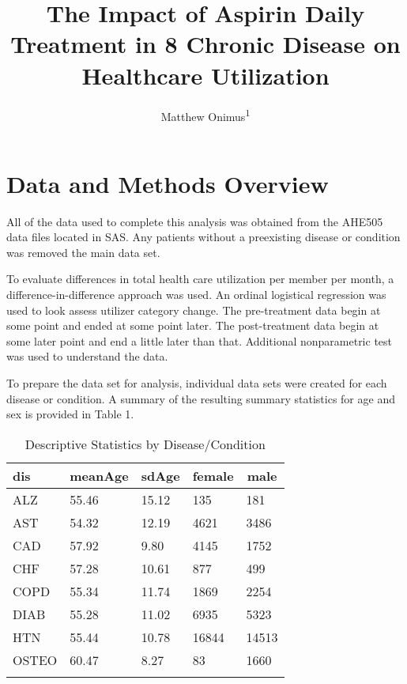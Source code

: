 \documentclass[
  english,
  doc,floatsintext]{apa6}
\title{The Impact of Aspirin Daily Treatment in 8 Chronic Disease on Healthcare Utilization}
\author{Matthew Onimus\textsuperscript{1}}
\date{}
\affiliation{\vspace{0.5cm}\textsuperscript{1} Merck \& Co C/O Jefferson Univserity}
\begin{document}
\maketitle

\hypertarget{data-and-methods-overview}{%
\section{Data and Methods Overview}\label{data-and-methods-overview}}

All of the data used to complete this analysis was obtained from the AHE505 data files located in SAS. Any patients without a preexisting disease or condition was removed the main data set.

To evaluate differences in total health care utilization per member per month, a difference-in-difference approach was used. An ordinal logistical regression was used to look assess utilizer category change. The pre-treatment data begin at some point and ended at some point later. The post-treatment data begin at some later point and end a little later than that. Additional nonparametric test was used to understand the data.

To prepare the data set for analysis, individual data sets were created for each disease or condition. A summary of the resulting summary statistics for age and sex is provided in Table 1.

\begin{table}[tbp]

\begin{center}
\begin{threeparttable}

\caption{\label{tab:table1}Descriptive Statistics by Disease/Condition}

\begin{tabular}{lllll}
\toprule{}
dis & \multicolumn{1}{c}{meanAge} & \multicolumn{1}{c}{sdAge} & \multicolumn{1}{c}{female} & \multicolumn{1}{c}{male}\\
\midrule{}
ALZ & 55.46 & 15.12 & 135 & 181\\
AST & 54.32 & 12.19 & 4621 & 3486\\
CAD & 57.92 & 9.80 & 4145 & 1752\\
CHF & 57.28 & 10.61 & 877 & 499\\
COPD & 55.34 & 11.74 & 1869 & 2254\\
DIAB & 55.28 & 11.02 & 6935 & 5323\\
HTN & 55.44 & 10.78 & 16844 & 14513\\
OSTEO & 60.47 & 8.27 & 83 & 1660\\
\bottomrule{}
\end{tabular}

\end{threeparttable}
\end{center}

\end{table}
\end{document}
